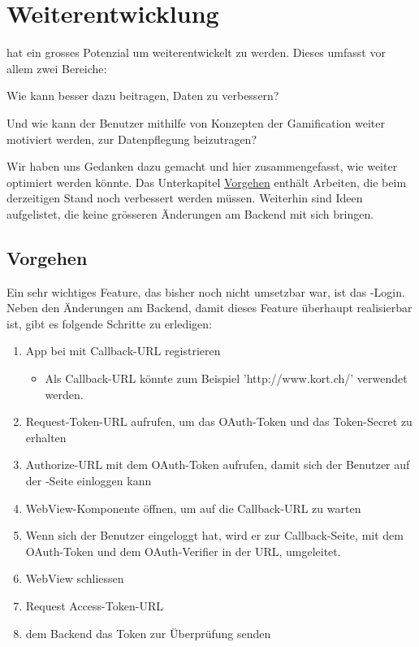 \chapter{Weiterentwicklung}
\label{pd-weiterentwicklung}

\kort{} hat ein grosses Potenzial um weiterentwickelt zu werden.
Dieses umfasst vor allem zwei Bereiche:

Wie kann \kort{} besser dazu beitragen,  Daten zu verbessern?

Und wie kann der Benutzer mithilfe von Konzepten der Gamification weiter motiviert werden, zur Datenpflegung beizutragen?

Wir haben uns Gedanken dazu gemacht und hier zusammengefasst, wie \kort{} weiter optimiert werden könnte.
Das Unterkapitel \hyperref[pd-weiterentwicklung-vorgehen]{Vorgehen} enthält Arbeiten, die beim derzeitigen Stand noch verbessert werden müssen. 
Weiterhin sind Ideen aufgelistet, die keine grösseren Änderungen am Backend mit sich bringen.

\section{Vorgehen}
\label{pd-weiterentwicklung-vorgehen}
Ein sehr wichtiges Feature, das bisher noch nicht umsetzbar war, ist das -Login.
Neben den Änderungen am Backend, damit dieses Feature überhaupt realisierbar ist, gibt es folgende Schritte zu erledigen:

\begin{enumerate}
	\item App bei  mit Callback-URL registrieren
	\begin{itemize}
		\item Als Callback-URL könnte zum Beispiel 'http://www.kort.ch/' verwendet werden.
	\end{itemize}
	\item Request-Token-URL aufrufen, um das OAuth-Token und das Token-Secret zu erhalten
	\item Authorize-URL mit dem OAuth-Token aufrufen, damit sich der Benutzer auf der -Seite einloggen kann
	\item WebView-Komponente öffnen, um auf die Callback-URL zu warten 
	\item Wenn sich der Benutzer eingeloggt hat, wird er zur Callback-Seite, mit dem OAuth-Token und dem OAuth-Verifier in der URL, umgeleitet.
	\item WebView schliessen
	\item Request Access-Token-URL
	\item dem Backend das Token zur Überprüfung senden
\end{enumerate}

